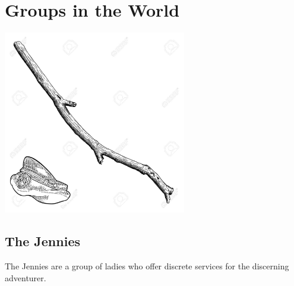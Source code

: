 \section{Groups in the World}

\vspace{4mm}

\begin{center}
\includegraphics[width=80mm]{./content/img/xxx.jpg}
\begin{figure}[h]
\end{figure}
\end{center}

\subsection*{The Jennies} 

The Jennies are a group of ladies who offer discrete services for the discerning adventurer.  

